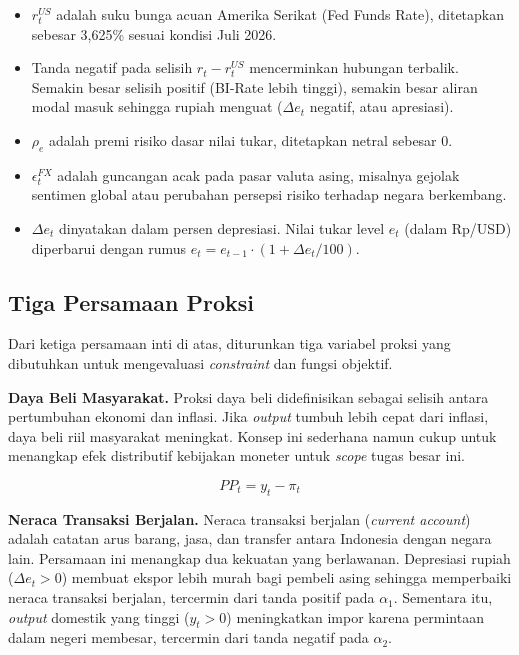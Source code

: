 \begin{itemize}
    \item $r_t^{US}$ adalah suku bunga acuan Amerika Serikat (Fed Funds Rate), ditetapkan sebesar 3,625\% sesuai kondisi Juli 2026.
    \item Tanda negatif pada selisih $r_t - r_t^{US}$ mencerminkan hubungan terbalik. Semakin besar selisih positif (BI-Rate lebih tinggi), semakin besar aliran modal masuk sehingga rupiah menguat ($\Delta e_t$ negatif, atau apresiasi).
    \item $\rho_e$ adalah premi risiko dasar nilai tukar, ditetapkan netral sebesar 0.
    \item $\epsilon_t^{FX}$ adalah guncangan acak pada pasar valuta asing, misalnya gejolak sentimen global atau perubahan persepsi risiko terhadap negara berkembang.
    \item $\Delta e_t$ dinyatakan dalam persen depresiasi. Nilai tukar level $e_t$ (dalam Rp/USD) diperbarui dengan rumus $e_t = e_{t-1} \cdot (1 + \Delta e_t / 100)$.
\end{itemize}

\subsection{Tiga Persamaan Proksi}

Dari ketiga persamaan inti di atas, diturunkan tiga variabel proksi yang dibutuhkan untuk mengevaluasi \textit{constraint} dan fungsi objektif.

\textbf{Daya Beli Masyarakat.} Proksi daya beli didefinisikan sebagai selisih antara pertumbuhan ekonomi dan inflasi. Jika \textit{output} tumbuh lebih cepat dari inflasi, daya beli riil masyarakat meningkat. Konsep ini sederhana namun cukup untuk menangkap efek distributif kebijakan moneter untuk \textit{scope} tugas besar ini.

\[
    PP_t = y_t - \pi_t
\]

\textbf{Neraca Transaksi Berjalan.} Neraca transaksi berjalan (\textit{current account}) adalah catatan arus barang, jasa, dan transfer antara Indonesia dengan negara lain. Persamaan ini menangkap dua kekuatan yang berlawanan. Depresiasi rupiah ($\Delta e_t > 0$) membuat ekspor lebih murah bagi pembeli asing sehingga memperbaiki neraca transaksi berjalan, tercermin dari tanda positif pada $\alpha_1$. Sementara itu, \textit{output} domestik yang tinggi ($y_t > 0$) meningkatkan impor karena permintaan dalam negeri membesar, tercermin dari tanda negatif pada $\alpha_2$.

